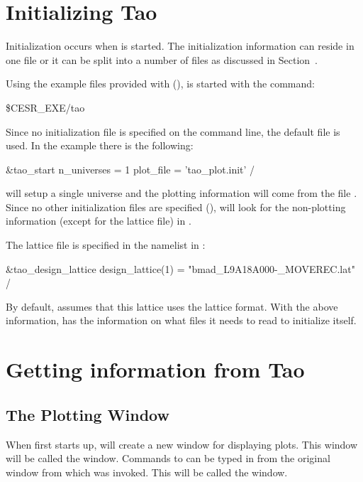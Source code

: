 \section{Initializing Tao}
\label{s:initializing}

Initialization occurs when \tao is started. The initialization
information can reside in one file or it can be split into a number of
files as discussed in Section~.

Using the example files provided with \tao (), \tao
is started with the command:
\begin{example}
  \$CESR_EXE/tao
\end{example}
Since no initialization file is specified on the command line, the
default file  is used. In the example  there
is the following:
\begin{example}
  &tao_start
    n_universes = 1
    plot_file = 'tao_plot.init'
  /
\end{example}
\tao will setup a single universe and the plotting information will
come from the file . Since no other initialization
files are specified (), \tao will look for the
non-plotting information (except for the lattice file) in .

The lattice file is specified in the  namelist
in :
\begin{example}
  &tao_design_lattice
    design_lattice(1) = "bmad_L9A18A000-_MOVEREC.lat"
  /
\end{example}
By default, \tao assumes that this lattice uses the \bmad lattice
format.  With the above information, \tao has the information on what
files it needs to read to initialize itself.

\section{Getting information from Tao}
\label{s:get.info}

\subsection{The Plotting Window}

When \tao first starts up, \tao will create a new window for
displaying plots. This window will be called the 
window. Commands to \tao can be typed in from the original window from
which \tao was invoked. This will be called the  window.

